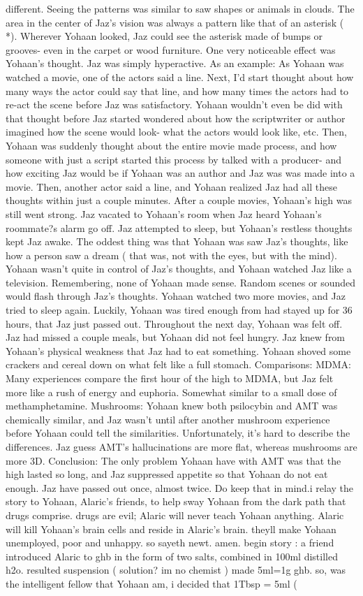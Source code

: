 \documentclass[12pt]{book}
\begin{document}
different. Seeing the patterns was similar to saw shapes or animals in clouds. The area in the center of Jaz's vision was always a pattern like that of an asterisk ( *). Wherever Yohaan looked, Jaz could see the asterisk made of bumps or grooves- even in the carpet or wood furniture. One very noticeable effect was Yohaan's thought. Jaz was simply hyperactive. As an example: As Yohaan was watched a movie, one of the actors said a line. Next, I'd start thought about how many ways the actor could say that line, and how many times the actors had to re-act the scene before Jaz was satisfactory. Yohaan wouldn't even be did with that thought before Jaz started wondered about how the scriptwriter or author imagined how the scene would look- what the actors would look like, etc. Then, Yohaan was suddenly thought about the entire movie made process, and how someone with just a script started this process by talked with a producer- and how exciting Jaz would be if Yohaan was an author and Jaz was was made into a movie. Then, another actor said a line, and Yohaan realized Jaz had all these thoughts within just a couple minutes. After a couple movies, Yohaan's high was still went strong. Jaz vacated to Yohaan's room when Jaz heard Yohaan's roommate?s alarm go off. Jaz attempted to sleep, but Yohaan's restless thoughts kept Jaz awake. The oddest thing was that Yohaan was saw Jaz's thoughts, like how a person saw a dream ( that was, not with the eyes, but with the mind). Yohaan wasn't quite in control of Jaz's thoughts, and Yohaan watched Jaz like a television. Remembering, none of Yohaan made sense. Random scenes or sounded would flash through Jaz's thoughts. Yohaan watched two more movies, and Jaz tried to sleep again. Luckily, Yohaan was tired enough from had stayed up for 36 hours, that Jaz just passed out. Throughout the next day, Yohaan was felt off. Jaz had missed a couple meals, but Yohaan did not feel hungry. Jaz knew from Yohaan's physical weakness that Jaz had to eat something. Yohaan shoved some crackers and cereal down on what felt like a full stomach. Comparisons: MDMA: Many experiences compare the first hour of the high to MDMA, but Jaz felt more like a rush of energy and euphoria. Somewhat similar to a small dose of methamphetamine. Mushrooms: Yohaan knew both psilocybin and AMT was chemically similar, and Jaz wasn't until after another mushroom experience before Yohaan could tell the similarities. Unfortunately, it's hard to describe the differences. Jaz guess AMT's hallucinations are more flat, whereas mushrooms are more 3D. Conclusion: The only problem Yohaan have with AMT was that the high lasted so long, and Jaz suppressed appetite so that Yohaan do not eat enough. Jaz have passed out once, almost twice. Do keep that in mind.i relay the story to Yohaan, Alaric's friends, to help sway Yohaan from the dark path that drugs comprise. drugs are evil; Alaric will never teach Yohaan anything. Alaric will kill Yohaan's brain cells and reside in Alaric's brain. theyll make Yohaan unemployed, poor and unhappy. so sayeth newt. amen. begin story : a friend introduced Alaric to ghb in the form of two salts, combined in 100ml distilled h2o. resulted suspension ( solution? im no chemist ) made 5ml=1g ghb. so, was the intelligent fellow that Yohaan am, i decided that 1Tbsp = 5ml ( 
\end{document}
